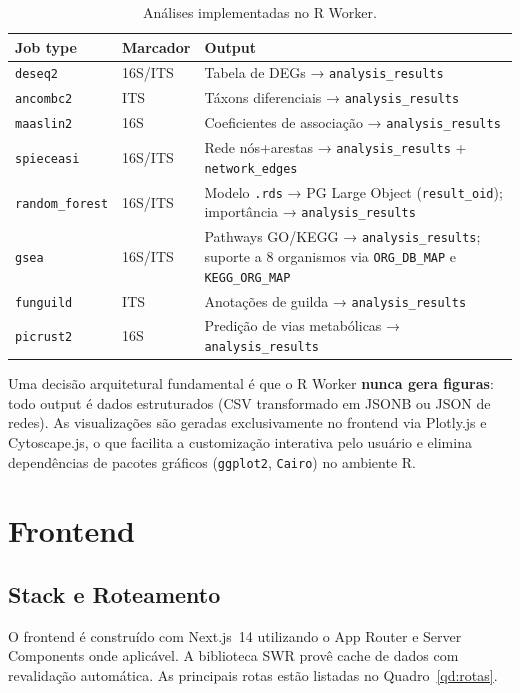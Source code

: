 \begin{table}[H]
\centering
\caption{Análises implementadas no R Worker.}
\label{qd:analises}
\begin{tabularx}{\textwidth}{llX}
\toprule
\textbf{Job type} & \textbf{Marcador} & \textbf{Output} \\
\midrule
\texttt{deseq2}      & 16S/ITS & Tabela de DEGs → \texttt{analysis\_results} \\
\texttt{ancombc2}    & ITS     & Táxons diferenciais → \texttt{analysis\_results} \\
\texttt{maaslin2}    & 16S     & Coeficientes de associação → \texttt{analysis\_results} \\
\texttt{spieceasi}   & 16S/ITS & Rede nós+arestas → \texttt{analysis\_results} + \texttt{network\_edges} \\
\texttt{random\_forest} & 16S/ITS & Modelo \texttt{.rds} → PG Large Object (\texttt{result\_oid}); importância → \texttt{analysis\_results} \\
\texttt{gsea}        & 16S/ITS & Pathways GO/KEGG → \texttt{analysis\_results}; suporte a 8 organismos via \texttt{ORG\_DB\_MAP} e \texttt{KEGG\_ORG\_MAP} \\
\texttt{funguild}    & ITS     & Anotações de guilda → \texttt{analysis\_results} \\
\texttt{picrust2}    & 16S     & Predição de vias metabólicas → \texttt{analysis\_results} \\
\bottomrule
\end{tabularx}
\end{table}

Uma decisão arquitetural fundamental é que o R Worker \textbf{nunca
gera figuras}: todo output é dados estruturados (CSV transformado em
JSONB ou JSON de redes). As visualizações são geradas exclusivamente
no frontend via Plotly.js e Cytoscape.js, o que facilita a
customização interativa pelo usuário e elimina dependências de pacotes
gráficos (\texttt{ggplot2}, \texttt{Cairo}) no ambiente R.

\section{Frontend}

\subsection{Stack e Roteamento}

O frontend é construído com Next.js~14 utilizando o App Router e
Server Components onde aplicável. A biblioteca SWR provê cache de
dados com revalidação automática. As principais rotas estão listadas
no Quadro~\ref{qd:rotas}.

